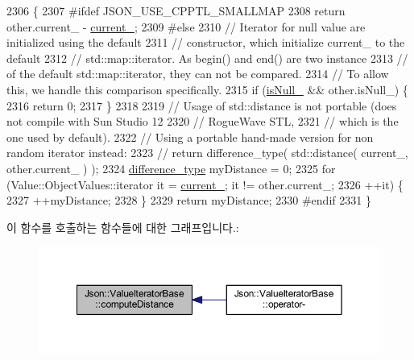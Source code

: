\begin{DoxyCode}
2306                                                               \{
2307 \textcolor{preprocessor}{#ifdef JSON\_USE\_CPPTL\_SMALLMAP}
2308   \textcolor{keywordflow}{return} other.current\_ - \hyperlink{class_json_1_1_value_iterator_base_ab3138ce8af8301cca3b041ea55cb922a}{current\_};
2309 \textcolor{preprocessor}{#else}
2310   \textcolor{comment}{// Iterator for null value are initialized using the default}
2311   \textcolor{comment}{// constructor, which initialize current\_ to the default}
2312   \textcolor{comment}{// std::map::iterator. As begin() and end() are two instance}
2313   \textcolor{comment}{// of the default std::map::iterator, they can not be compared.}
2314   \textcolor{comment}{// To allow this, we handle this comparison specifically.}
2315   \textcolor{keywordflow}{if} (\hyperlink{class_json_1_1_value_iterator_base_a3e08b114a1aed9bde518c527f94a8c59}{isNull\_} && other.isNull\_) \{
2316     \textcolor{keywordflow}{return} 0;
2317   \}
2318 
2319   \textcolor{comment}{// Usage of std::distance is not portable (does not compile with Sun Studio 12}
2320   \textcolor{comment}{// RogueWave STL,}
2321   \textcolor{comment}{// which is the one used by default).}
2322   \textcolor{comment}{// Using a portable hand-made version for non random iterator instead:}
2323   \textcolor{comment}{//   return difference\_type( std::distance( current\_, other.current\_ ) );}
2324   \hyperlink{class_json_1_1_value_iterator_base_a4e44bf8cbd17ec8d6e2c185904a15ebd}{difference\_type} myDistance = 0;
2325   \textcolor{keywordflow}{for} (Value::ObjectValues::iterator it = \hyperlink{class_json_1_1_value_iterator_base_ab3138ce8af8301cca3b041ea55cb922a}{current\_}; it != other.current\_;
2326        ++it) \{
2327     ++myDistance;
2328   \}
2329   \textcolor{keywordflow}{return} myDistance;
2330 \textcolor{preprocessor}{#endif}
2331 \}
\end{DoxyCode}
이 함수를 호출하는 함수들에 대한 그래프입니다.\+:
\nopagebreak
\begin{figure}[H]
\begin{center}
\leavevmode
\includegraphics[width=350pt]{class_json_1_1_value_iterator_base_af11473c9e20d07782e42b52a2f9e4540_icgraph}
\end{center}
\end{figure}
\mbox{\label{class_json_1_1_value_iterator_base_a496e6aba44808433ec5858c178be5719}} 

